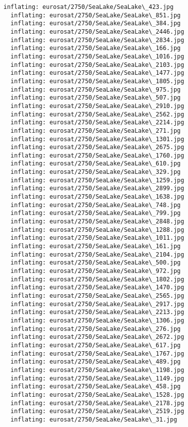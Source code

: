 \documentclass[11pt]{article}
\begin{document}
\begin{Verbatim}[commandchars=\\\{\}]
  inflating: eurosat/2750/SeaLake/SeaLake\_423.jpg
  inflating: eurosat/2750/SeaLake/SeaLake\_851.jpg
  inflating: eurosat/2750/SeaLake/SeaLake\_384.jpg
  inflating: eurosat/2750/SeaLake/SeaLake\_2446.jpg
  inflating: eurosat/2750/SeaLake/SeaLake\_2834.jpg
  inflating: eurosat/2750/SeaLake/SeaLake\_166.jpg
  inflating: eurosat/2750/SeaLake/SeaLake\_1016.jpg
  inflating: eurosat/2750/SeaLake/SeaLake\_2103.jpg
  inflating: eurosat/2750/SeaLake/SeaLake\_1477.jpg
  inflating: eurosat/2750/SeaLake/SeaLake\_1805.jpg
  inflating: eurosat/2750/SeaLake/SeaLake\_975.jpg
  inflating: eurosat/2750/SeaLake/SeaLake\_507.jpg
  inflating: eurosat/2750/SeaLake/SeaLake\_2910.jpg
  inflating: eurosat/2750/SeaLake/SeaLake\_2562.jpg
  inflating: eurosat/2750/SeaLake/SeaLake\_2214.jpg
  inflating: eurosat/2750/SeaLake/SeaLake\_271.jpg
  inflating: eurosat/2750/SeaLake/SeaLake\_1301.jpg
  inflating: eurosat/2750/SeaLake/SeaLake\_2675.jpg
  inflating: eurosat/2750/SeaLake/SeaLake\_1760.jpg
  inflating: eurosat/2750/SeaLake/SeaLake\_610.jpg
  inflating: eurosat/2750/SeaLake/SeaLake\_329.jpg
  inflating: eurosat/2750/SeaLake/SeaLake\_1259.jpg
  inflating: eurosat/2750/SeaLake/SeaLake\_2899.jpg
  inflating: eurosat/2750/SeaLake/SeaLake\_1638.jpg
  inflating: eurosat/2750/SeaLake/SeaLake\_748.jpg
  inflating: eurosat/2750/SeaLake/SeaLake\_799.jpg
  inflating: eurosat/2750/SeaLake/SeaLake\_2848.jpg
  inflating: eurosat/2750/SeaLake/SeaLake\_1288.jpg
  inflating: eurosat/2750/SeaLake/SeaLake\_1011.jpg
  inflating: eurosat/2750/SeaLake/SeaLake\_161.jpg
  inflating: eurosat/2750/SeaLake/SeaLake\_2104.jpg
  inflating: eurosat/2750/SeaLake/SeaLake\_500.jpg
  inflating: eurosat/2750/SeaLake/SeaLake\_972.jpg
  inflating: eurosat/2750/SeaLake/SeaLake\_1802.jpg
  inflating: eurosat/2750/SeaLake/SeaLake\_1470.jpg
  inflating: eurosat/2750/SeaLake/SeaLake\_2565.jpg
  inflating: eurosat/2750/SeaLake/SeaLake\_2917.jpg
  inflating: eurosat/2750/SeaLake/SeaLake\_2213.jpg
  inflating: eurosat/2750/SeaLake/SeaLake\_1306.jpg
  inflating: eurosat/2750/SeaLake/SeaLake\_276.jpg
  inflating: eurosat/2750/SeaLake/SeaLake\_2672.jpg
  inflating: eurosat/2750/SeaLake/SeaLake\_617.jpg
  inflating: eurosat/2750/SeaLake/SeaLake\_1767.jpg
  inflating: eurosat/2750/SeaLake/SeaLake\_489.jpg
  inflating: eurosat/2750/SeaLake/SeaLake\_1198.jpg
  inflating: eurosat/2750/SeaLake/SeaLake\_1149.jpg
  inflating: eurosat/2750/SeaLake/SeaLake\_458.jpg
  inflating: eurosat/2750/SeaLake/SeaLake\_1528.jpg
  inflating: eurosat/2750/SeaLake/SeaLake\_2178.jpg
  inflating: eurosat/2750/SeaLake/SeaLake\_2519.jpg
  inflating: eurosat/2750/SeaLake/SeaLake\_31.jpg

\end{Verbatim}
\end{document}
